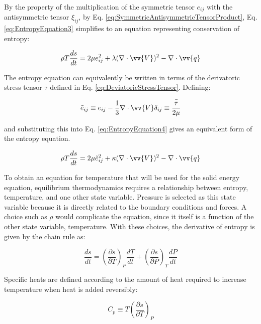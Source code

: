 \documentclass[10pt]{article}
\numberwithin{equation}{section} %
\begin{document}
By the property of the multiplication of the symmetric tensor \(e_{ij}\) with the antisymmetric tensor \(\xi_{ij}\), by Eq. \eqref{eq:SymmetricAntisymmetricTensorProduct}, Eq. \eqref{eq:EntropyEquation3} simplifies to an equation representing conservation of entropy:

\begin{equation}
\label{eq:EntropyEquation4}
\rho T\frac{ds}{dt}=2\mu e_{ij}^2+\lambda(\nabla\cdot\vv{V})^2-\nabla\cdot\vv{q}\\
\end{equation}

The entropy equation can equivalently be written in terms of the derivatoric stress tensor \(\bar{\bar{\tau}}\) defined in Eq. \eqref{eq:DeviatoricStressTensor}. Defining:

\begin{equation}
\label{eq:DeviatoricStressTensorv2}
\tilde{e}_{ij}\equiv e_{ij}-\frac{1}{3}\nabla\cdot\vv{V}\delta_{ij}\equiv\frac{\bar{\bar{\tau}}}{2\mu}
\end{equation}

and substituting this into Eq. \eqref{eq:EntropyEquation4} gives an equivalent form of the entropy equation.

\begin{equation}
\label{eq:EntropyEquation5}
\rho T\frac{ds}{dt}=2\mu \tilde{e}_{ij}^2+\kappa(\nabla\cdot\vv{V})^2-\nabla\cdot\vv{q}
\end{equation}

To obtain an equation for temperature that will be used for the solid energy equation, equilibrium thermodynamics requires a relationship between entropy, temperature, and one other state variable. Pressure is selected as this state variable because it is directly related to the boundary conditions and forces. A choice such as \(\rho\) would complicate the equation, since it itself is a function of the other state variable, temperature. With these choices, the derivative of entropy is given by the chain rule as:

\begin{equation}
\label{eq:EntropyStateVariable}
\frac{ds}{dt}=\left(\frac{\partial s}{\partial T}\right)_P\frac{dT}{dt}+\left(\frac{\partial s}{\partial P}\right)_T\frac{dP}{dt}
\end{equation}

Specific heats are defined according to the amount of heat required to increase temperature when heat is added reversibly: 

\begin{equation}
\label{eq:CpDef}
C_p\equiv T\left(\frac{\partial s}{\partial T}\right)_P
\end{equation}
\end{document}
